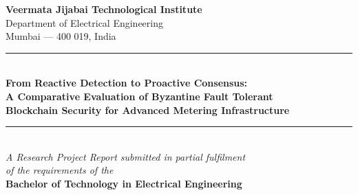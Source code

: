\documentclass[12pt, oneside, a4paper]{report}
\theoremstyle{definition}
\theoremstyle{remark}
\begin{document}


\begin{titlepage}
\centering

\vspace*{1.5cm}


{\large \textbf{Veermata Jijabai Technological Institute}}\\[0.2cm]
{\large Department of Electrical Engineering}\\[0.2cm]
{\large Mumbai --- 400 019, India}\\[2.5cm]

\rule{\linewidth}{0.5mm}\\[0.4cm]
{\LARGE \bfseries From Reactive Detection to Proactive Consensus:}\\[0.3cm]
{\Large \bfseries A Comparative Evaluation of Byzantine Fault Tolerant}\\[0.3cm]
{\Large \bfseries Blockchain Security for Advanced Metering Infrastructure}\\[0.4cm]
\rule{\linewidth}{0.5mm}\\[1.5cm]

{\large \emph{A Research Project Report submitted in partial fulfilment}}\\[0.1cm]
{\large \emph{of the requirements of the}}\\[0.3cm]
{\large \textbf{Bachelor of Technology in Electrical Engineering}}\\[2.0cm]


\end{titlepage}
\end{document}
